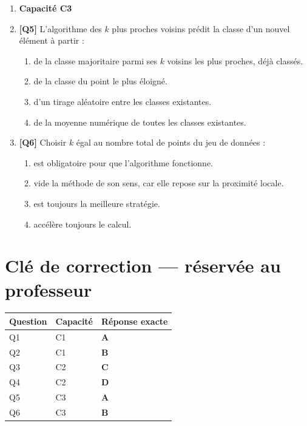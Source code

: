 \begin{enumerate}
\item[] \textbf{Capacité C3}

\item \textbf{[Q5]} L'algorithme des $k$ plus proches voisins prédit la classe d'un nouvel élément à partir :
  \begin{enumerate}[label=\Alph*.]
    \item de la classe majoritaire parmi ses $k$ voisins les plus proches, déjà classés.
    \item de la classe du point le plus éloigné.
    \item d'un tirage aléatoire entre les classes existantes.
    \item de la moyenne numérique de toutes les classes existantes.
  \end{enumerate}

\item \textbf{[Q6]} Choisir $k$ égal au nombre total de points du jeu de données :
  \begin{enumerate}[label=\Alph*.]
    \item est obligatoire pour que l'algorithme fonctionne.
    \item vide la méthode de son sens, car elle repose sur la proximité locale.
    \item est toujours la meilleure stratégie.
    \item accélère toujours le calcul.
  \end{enumerate}

\end{enumerate}

\ifnxVersionProfesseur
\clearpage
\section*{Clé de correction — réservée au professeur}

\begin{center}
\begin{tabular}{lll}
\hline
Question & Capacité & Réponse exacte \\
\hline
Q1 & C1 & \textbf{A} \\
Q2 & C1 & \textbf{B} \\
Q3 & C2 & \textbf{C} \\
Q4 & C2 & \textbf{D} \\
Q5 & C3 & \textbf{A} \\
Q6 & C3 & \textbf{B} \\
\hline
\end{tabular}
\end{center}


